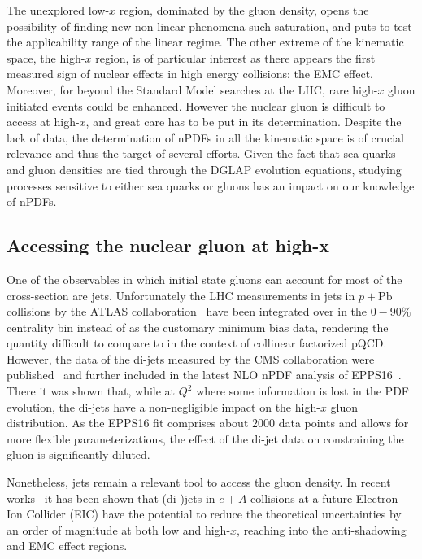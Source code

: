 The unexplored low-$x$ region, dominated by the gluon density, opens the possibility of finding new non-linear phenomena such saturation, and puts to test the applicability range of the linear regime. The other extreme of the kinematic space, the high-$x$ region, is of particular interest as there appears the first measured sign of nuclear effects in high energy collisions: the EMC effect. Moreover, for beyond the Standard Model searches at the LHC, rare high-$x$ gluon initiated events could be enhanced. However the nuclear gluon is difficult to access at high-$x$, and great care has to be put in its determination. Despite the lack of data, the determination of nPDFs in all the kinematic space is of crucial relevance and thus the target of several efforts. Given the fact that sea quarks and gluon densities are tied through the DGLAP evolution equations, studying processes sensitive to either sea quarks or gluons has an impact on our knowledge of nPDFs.    



\subsection{Accessing the nuclear gluon at high-x}

One of the observables in which initial state gluons can account for most of the cross-section are jets. Unfortunately the LHC measurements in jets in $p+\mathrm{Pb}$ collisions by the ATLAS collaboration~\cite{ATLAS:2014cpa} have been integrated over in the $0-90\%$ centrality bin instead of as the customary minimum bias data, rendering the quantity difficult to compare to in the context of collinear factorized pQCD. However, the data of the di-jets measured by the CMS collaboration were published~\cite{Chatrchyan:2014hqa} and further included in the latest NLO nPDF analysis of EPPS16~\cite{Eskola:2016oht}. There it was shown that, while at $Q^{2}$ where some information is lost in the PDF evolution, the di-jets have a non-negligible impact on the high-$x$ gluon distribution. As the EPPS16 fit comprises about $2000$ data points and allows for more flexible parameterizations, the effect of the di-jet data on constraining the gluon is significantly diluted. 

Nonetheless, jets remain a relevant tool to access the gluon density. In recent works~\cite{PhysRevD.95.094013, PhysRevD.97.114013} it has been shown that (di-)jets in $e+A$ collisions at a future Electron-Ion Collider (EIC) have the potential to reduce the theoretical uncertainties by an order of magnitude at both low and high-$x$, reaching into the anti-shadowing and EMC effect regions.

